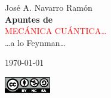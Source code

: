 %
%

\newcommand*{\titleTH}{\begingroup%
\raggedleft
\vspace*{\baselineskip}
{\Large José A. Navarro Ramón}\\[0.167\textheight]
{\bfseries Apuntes de}\\[\baselineskip]
{\textcolor{red}{\Huge MECÁNICA CUÁNTICA\dots}}\\[\baselineskip]
{\dots a lo Feynman\dots}\par
\vspace{2ex}
\today\par
\vspace{20ex}
{\Large \includegraphics[width=2.0cm]{./img/static/Cc-by-nc-sa_icon.eps}}\par
\vspace*{3\baselineskip}
\endgroup}

\titleTH




